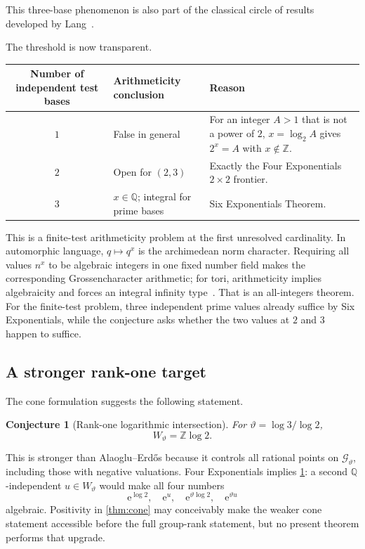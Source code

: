 \documentclass[11pt,oneside]{article}
\newtheorem{conjecture}[theorem]{Conjecture}
\theoremstyle{definition}
\newcommand{\Q}{\mathbb{Q}}
\newcommand{\Z}{\mathbb{Z}}
\newcommand{\ee}{\mathrm{e}}
\newcommand{\cG}{\mathscr{G}}
\begin{document}
This three-base phenomenon is also part of the classical circle of results developed by Lang~\cite{Lang1966}.

The threshold is now transparent.

\begin{center}
\begin{tabularx}{0.94\textwidth}{@{}c X X@{}}
\toprule
Number of independent test bases & Arithmeticity conclusion & Reason \\
\midrule
$1$ & False in general & For an integer $A>1$ that is not a power of $2$, $x=\log_2A$ gives $2^x=A$ with $x\notin\Z$. \\
$2$ & Open for $(2,3)$ & Exactly the Four Exponentials $2\times2$ frontier. \\
$3$ & $x\in\Q$; integral for prime bases & Six Exponentials Theorem. \\
\bottomrule
\end{tabularx}
\end{center}

This is a finite-test arithmeticity problem at the first unresolved cardinality.  In automorphic language, $q\mapsto q^x$ is the archimedean norm character.  Requiring all values $n^x$ to be algebraic integers in one fixed number field makes the corresponding Grossencharacter arithmetic; for tori, arithmeticity implies algebraicity and forces an integral infinity type~\cite{Waldschmidt1982}.  That is an all-integers theorem.  For the finite-test problem, three independent prime values already suffice by Six Exponentials, while the conjecture asks whether the two values at $2$ and $3$ happen to suffice.

\subsection{A stronger rank-one target}

The cone formulation suggests the following statement.

\begin{conjecture}[Rank-one logarithmic intersection]\label{conj:rankone}
For $\vartheta=\log3/\log2$,
\[
      W_{\vartheta}=\Z\log2.
\]
\end{conjecture}

This is stronger than Alaoglu--Erd\H{o}s because it controls all rational points on $\cG_{\vartheta}$, including those with negative valuations.  Four Exponentials implies \cref{conj:rankone}: a second $\Q$-independent $u\in W_{\vartheta}$ would make all four numbers
\[
     \ee^{\log2},\quad \ee^u,
     \quad \ee^{\vartheta\log2},\quad \ee^{\vartheta u}
\]
algebraic.  Positivity in \cref{thm:cone} may conceivably make the weaker cone statement accessible before the full group-rank statement, but no present theorem performs that upgrade.
\end{document}
